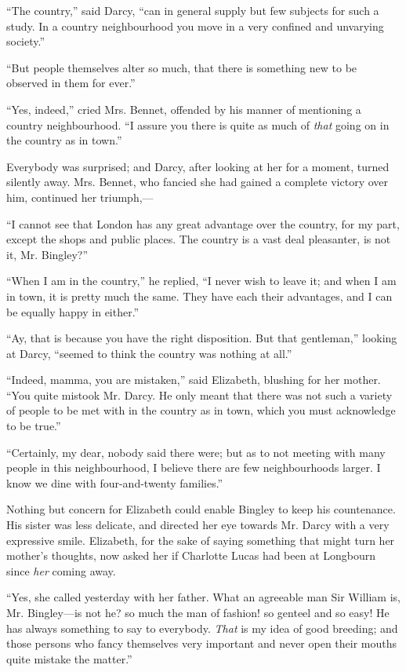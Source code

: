 ``The country,'' said Darcy, ``can in general supply but few subjects for such a study. In a country neighbourhood you move in a very confined and unvarying society.''

``But people themselves alter so much, that there is something new to be observed in them for ever.''

``Yes, indeed,'' cried Mrs. Bennet, offended by his manner of mentioning a country neighbourhood. ``I assure you there is quite as much of \textit{that} going on in the country as in town.''

Everybody was surprised; and Darcy, after looking at her for a moment, turned silently away. Mrs. Bennet, who fancied she had gained a complete victory over him, continued her triumph,---

``I cannot see that London has any great advantage over the country, for my part, except the shops and public places. The country is a vast deal pleasanter, is not it, Mr. Bingley?''

``When I am in the country,'' he replied, ``I never wish to leave it; and when I am in town, it is pretty much the same. They have each their advantages, and I can be equally happy in either.''

``Ay, that is because you have the right disposition. But that gentleman,'' looking at Darcy, ``seemed to think the country was nothing at all.''

``Indeed, mamma, you are mistaken,'' said Elizabeth, blushing for her mother. ``You quite mistook Mr. Darcy. He only meant that there was not such a variety of people to be met with in the country as in town, which you must acknowledge to be true.''

``Certainly, my dear, nobody said there were; but as to not meeting with many people in this neighbourhood, I believe there are few neighbourhoods larger. I know we dine with four-and-twenty families.''

Nothing but concern for Elizabeth could enable Bingley to keep his countenance. His sister was less delicate, and directed her eye towards Mr. Darcy with a very expressive smile. Elizabeth, for the sake of saying something that might turn her mother's thoughts, now asked her if Charlotte Lucas had been at Longbourn since \textit{her} coming away.

``Yes, she called yesterday with her father. What an agreeable man Sir William is, Mr. Bingley---is not he? so much the man of fashion! so genteel and so easy! He has always something to say to everybody. \textit{That} is my idea of good breeding; and those persons who fancy themselves very important and never open their mouths quite mistake the matter.''

